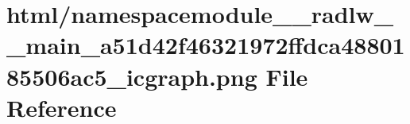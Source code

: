 \hypertarget{namespacemodule____radlw____main__a51d42f46321972ffdca4880185506ac5__icgraph_8png}{}\section{html/namespacemodule\+\_\+\+\_\+radlw\+\_\+\+\_\+main\+\_\+a51d42f46321972ffdca4880185506ac5\+\_\+icgraph.png File Reference}
\label{namespacemodule____radlw____main__a51d42f46321972ffdca4880185506ac5__icgraph_8png}
